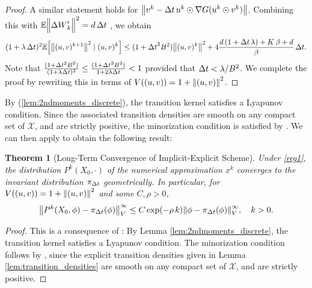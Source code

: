 \documentclass[11pt, twoside]{report}
\newtheorem{theorem}{Theorem}[section]
\begin{document}
\begin{proof}
   A similar statement holds for $\left\lVert v^k-{\Delta t}\, u^k \odot \nabla G(u^k \odot v^k)\right\rVert$.
    Combining this with $ \EE\norm{ \deltaw^i_k}^2= d\,\Delta t$ , we obtain  
    \begin{align*}
    (1+\lambda \,\deltat)^2 \EE\Bigl[\norm{(u,v)^{k+1}}^2 \mid (u,v)^k\Bigr] \leq (1+\deltat^2 \cinfty^2)\norm{(u,v)^{k}}^2  + 
    4{ \frac{d\,( 1 + \deltat \,\lambda) + \ccc\,\beta + d}{\beta}}\,\deltat.
    \end{align*}
    Note that
    $
    \frac{(1+{\Delta t}^2 B^2)}{(1+\lambda {\Delta t})^2} \leq \frac{(1+{\Delta t}^2 B^2)}{1+2\lambda {\Delta t}} <1
    $
    provided that ${\Delta t}  < \lambda/B^2 $. We complete the proof by rewriting this in terms of $V((u,v))=1+\left\lVert(u,v)\right\rVert^2$.
\end{proof}

By  (\ref{lem:2ndmoments_discrete}), the transition kernel satisfies a Lyapunov condition. Since the associated transition densities are smooth on any compact set of $\mathcal X$, and are strictly positive, the minorization condition is satisfied by \cite[Lemma 2.3]{mattingly2002ergodicity}. We can then apply \cite[Theorem 2.25]{Lelievre2016-hx} to obtain the following result:
\begin{theorem}[Long-Term Convergence of Implicit-Explicit Scheme]
\label{num_erg} Under \ref{reg1}, the distribution $P^k(X_0,\cdot)$ of the numerical approximation $x^k$  converges to the invariant distribution $\pi_{{\Delta t}}$ geometrically. In particular, for $V((u,v))=1+\left\lVert(u,v)\right\rVert^2$ and some $C,\rho>0$,
    \[\norm{ P^k(X_0,\phi )  - \pi_{\deltat}(\phi)}^\infty_V\le  C \exp(-\rho\, k) \norm{\phi-\pi_\tstep(\phi)}^\infty_V,\quad k>0.
    \]
\end{theorem}

\begin{proof}
    This is a consequence of \cite[Theorem 2.25]{Lelievre2016-hx}: By  Lemma \ref{lem:2ndmoments_discrete}, the transition kernel satisfies a Lyapunov condition. The minorization condition  follows by \cite[Lemma 2.3]{mattingly2002ergodicity}, since  the  explicit transition densities given in Lemma \ref{lem:transition_densities} are smooth on any compact set of $\mathcal X$, and are strictly positive.
\end{proof}
\end{document}
